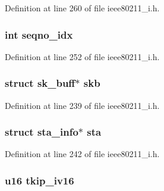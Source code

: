Definition at line 260 of file ieee80211\-\_\-i.\-h.

\hypertarget{structieee80211__rx__data_a5e3319f7a0db16f766c18522826f155e}{
\subsubsection[{seqno\-\_\-idx}]{\setlength{\rightskip}{0pt plus 5cm}int seqno\-\_\-idx}}\label{structieee80211__rx__data_a5e3319f7a0db16f766c18522826f155e}


Definition at line 252 of file ieee80211\-\_\-i.\-h.

\hypertarget{structieee80211__rx__data_aeba6836824708325a83121030f092c30}{
\subsubsection[{skb}]{\setlength{\rightskip}{0pt plus 5cm}struct sk\-\_\-buff$\ast$ skb}}\label{structieee80211__rx__data_aeba6836824708325a83121030f092c30}


Definition at line 239 of file ieee80211\-\_\-i.\-h.

\hypertarget{structieee80211__rx__data_aafa9dadbeccd54b4a6b9f77f2908a093}{
\subsubsection[{sta}]{\setlength{\rightskip}{0pt plus 5cm}struct {\bf sta\-\_\-info}$\ast$ sta}}\label{structieee80211__rx__data_aafa9dadbeccd54b4a6b9f77f2908a093}


Definition at line 242 of file ieee80211\-\_\-i.\-h.

\hypertarget{structieee80211__rx__data_a1b0e9025f6b0dc8ceb064641a7909a26}{
\subsubsection[{tkip\-\_\-iv16}]{\setlength{\rightskip}{0pt plus 5cm}u16 tkip\-\_\-iv16}}\label{structieee80211__rx__data_a1b0e9025f6b0dc8ceb064641a7909a26}


